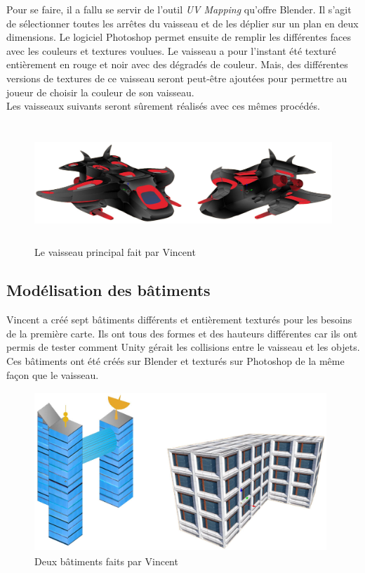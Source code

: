 \documentclass[10pt, titlepage]{report}
\begin{document}
Pour se faire, il a fallu se servir de l'outil \textit{UV Mapping} qu'offre Blender. Il s'agit de sélectionner toutes les arrêtes du vaisseau et de les déplier sur un plan en deux dimensions. Le logiciel Photoshop permet ensuite de remplir les différentes faces avec les couleurs et textures voulues. Le vaisseau a pour l'instant été texturé entièrement en rouge et noir avec des dégradés de couleur. Mais, des différentes versions de textures de ce vaisseau seront peut-être ajoutées pour permettre au joueur de choisir la couleur de son vaisseau.\\

Les vaisseaux suivants seront sûrement réalisés avec ces mêmes procédés.

\begin{figure}
\center
\includegraphics[height=4.5cm, width=15cm]{vaisseau_vincent.jpg}
\caption{Le vaisseau principal fait par Vincent}
\end{figure}

\subsection{Modélisation des bâtiments}

Vincent a créé sept bâtiments différents et entièrement texturés pour les besoins de la première carte. Ils ont tous des formes et des hauteurs différentes car ils ont permis de tester comment Unity gérait les collisions entre le vaisseau et les objets.\\

Ces bâtiments ont été créés sur Blender et texturés sur Photoshop de la même façon que le vaisseau.

\begin{figure}
\center
\includegraphics[height=6cm, width=11cm]{batiments_vincent.jpg}
\caption{Deux bâtiments faits par Vincent}
\end{figure}
\end{document}
